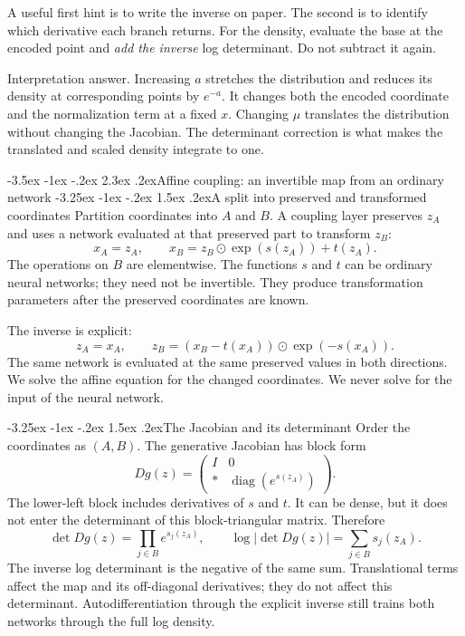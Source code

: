 \documentclass[11pt,a4paper]{article}
\makeatletter
\renewcommand\section{\@startsection{section}{1}{\z@}%
  {-3.5ex \@plus -1ex \@minus -.2ex}%
  {2.3ex \@plus .2ex}{\normalfont\Large}}
\renewcommand\subsection{\@startsection{subsection}{2}{\z@}%
  {-3.25ex \@plus -1ex \@minus -.2ex}%
  {1.5ex \@plus .2ex}{\normalfont\large}}
\makeatother
\begin{document}
A useful first hint is to write the inverse on paper. The second is to identify
which derivative each branch returns. For the density, evaluate the base at
the encoded point and \emph{add the inverse} log determinant. Do not subtract
it again.

Interpretation answer. Increasing $a$ stretches the distribution and
reduces its density at corresponding points by $e^{-a}$. It changes both the
encoded coordinate and the normalization term at a fixed $x$. Changing $\mu$
translates the distribution without changing the Jacobian. The determinant
correction is what makes the translated and scaled density integrate to one.

\section{Affine coupling: an invertible map from an ordinary network}
\subsection{A split into preserved and transformed coordinates}
Partition coordinates into $A$ and $B$. A coupling layer preserves $z_A$ and
uses a network evaluated at that preserved part to transform $z_B$:
\[
 x_A=z_A,\qquad
 x_B=z_B\odot\exp(s(z_A))+t(z_A).
\]
The operations on $B$ are elementwise. The functions $s$ and $t$ can be
ordinary neural networks; they need not be invertible. They produce
transformation parameters after the preserved coordinates are known.

The inverse is explicit:
\[
 z_A=x_A,\qquad
 z_B=(x_B-t(x_A))\odot\exp(-s(x_A)).
\]
The same network is evaluated at the same preserved values in both directions.
We solve the affine equation for the changed coordinates. We never solve for
the input of the neural network.

\subsection{The Jacobian and its determinant}
Order the coordinates as $(A,B)$. The generative Jacobian has block form
\[
 Dg(z)=\begin{pmatrix}
 I & 0\\
 * & \operatorname{diag}(e^{s(z_A)})
 \end{pmatrix}.
\]
The lower-left block includes derivatives of $s$ and $t$. It can be dense, but
it does not enter the determinant of this block-triangular matrix. Therefore
\[
 \det Dg(z)=\prod_{j\in B}e^{s_j(z_A)},\qquad
 \log|\det Dg(z)|=\sum_{j\in B}s_j(z_A).
\]
The inverse log determinant is the negative of the same sum. Translational
terms affect the map and its off-diagonal derivatives; they do not affect
this determinant. Autodifferentiation through the explicit inverse still
trains both networks through the full log density.
\end{document}
